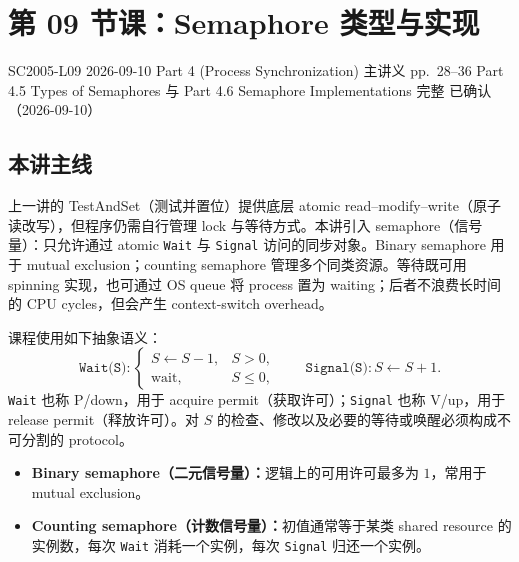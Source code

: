 
\section{第 09 节课：Semaphore 类型与实现}
\label{lecture:SC2005-L09}

\lecturemeta
  {SC2005-L09}
  {2026-09-10}
  {Part 4 (Process Synchronization)}
  {主讲义 pp.~28--36}
  {Part 4.5 Types of Semaphores 与 Part 4.6 Semaphore Implementations 完整}
  {已确认（2026-09-10）}

\subsection{本讲主线}

上一讲的 TestAndSet（测试并置位）提供底层 atomic read--modify--write（原子读改写），但程序仍需自行管理 lock 与等待方式。本讲引入 semaphore（信号量）：只允许通过 atomic \texttt{Wait} 与 \texttt{Signal} 访问的同步对象。Binary semaphore 用于 mutual exclusion；counting semaphore 管理多个同类资源。等待既可用 spinning 实现，也可通过 OS queue 将 process 置为 waiting；后者不浪费长时间的 CPU cycles，但会产生 context-switch overhead。



课程使用如下抽象语义：
\[
  \texttt{Wait(S)}:
  \begin{cases}
    S\gets S-1, & S>0,\\
    \text{wait}, & S\le 0,
  \end{cases}
  \qquad
  \texttt{Signal(S)}:S\gets S+1.
\]
\texttt{Wait} 也称 P/down，用于 acquire permit（获取许可）；\texttt{Signal} 也称 V/up，用于 release permit（释放许可）。对 $S$ 的检查、修改以及必要的等待或唤醒必须构成不可分割的 protocol。

\begin{itemize}
  \item \textbf{Binary semaphore（二元信号量）：}逻辑上的可用许可最多为 $1$，常用于 mutual exclusion。
  \item \textbf{Counting semaphore（计数信号量）：}初值通常等于某类 shared resource 的实例数，每次 \texttt{Wait} 消耗一个实例，每次 \texttt{Signal} 归还一个实例。
\end{itemize}

